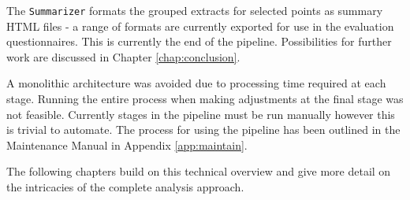   The \texttt{Summarizer} formats the grouped extracts for selected points as summary HTML files - a range of formats are currently exported for use in the evaluation questionnaires. This is currently the end of the pipeline. Possibilities for further work are discussed in Chapter \ref{chap:conclusion}.

  A monolithic architecture was avoided due to processing time required at each stage. Running the entire process when making adjustments at the final stage was not feasible. Currently stages in the pipeline must be run manually however this is trivial to automate. The process for using the pipeline has been outlined in the Maintenance Manual in Appendix \ref{app:maintain}.

  The following chapters build on this technical overview and give more detail on the intricacies of the complete analysis approach.
